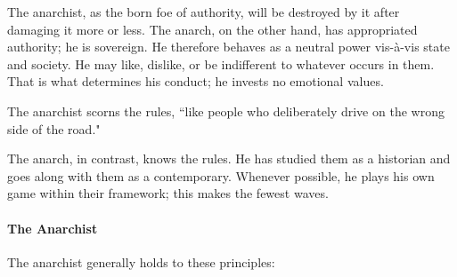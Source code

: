 \begin{quotex}
The anarchist, as the born foe of authority, will be destroyed by it after damaging it more or less. The anarch, on the other hand, has appropriated authority; he is sovereign. He therefore behaves as a neutral power vis-à-vis state and society. He may like, dislike, or be indifferent to whatever occurs in them. That is what determines his conduct; he invests no emotional values. 

\end{quotex}
The anarchist scorns the rules, ``like people who deliberately drive on the wrong side of the road."

\begin{quotex}
The anarch, in contrast, knows the rules. He has studied them as a historian and goes along with them as a contemporary. Whenever possible, he plays his own game within their framework; this makes the fewest waves. 

\end{quotex}
\paragraph{The Anarchist}
The anarchist generally holds to these principles:

